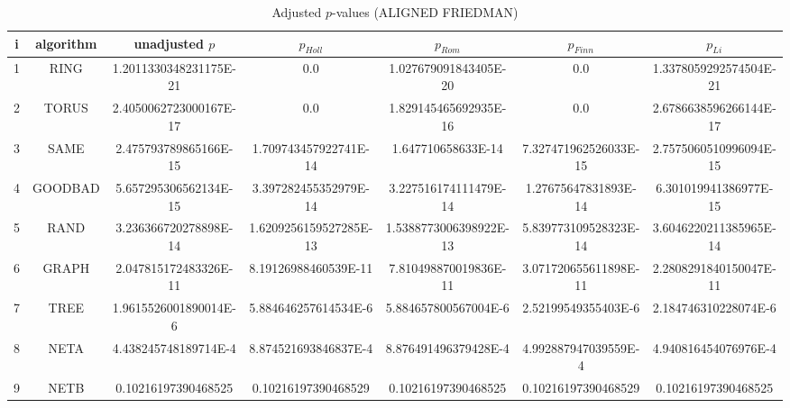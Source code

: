 \documentclass[a4paper,10pt]{article}
\begin{document}
\begin{landscape}
\begin{table}[!htp]
\centering\scriptsize
\caption{Adjusted $p$-values (ALIGNED FRIEDMAN)}
\begin{tabular}{ccccccc}
i&algorithm&unadjusted $p$&$p_{Holl}$&$p_{Rom}$&$p_{Finn}$&$p_{Li}$\\
\hline
1& RING&1.2011330348231175E-21&0.0&1.027679091843405E-20&0.0&1.3378059292574504E-21\\
2& TORUS&2.4050062723000167E-17&0.0&1.829145465692935E-16&0.0&2.6786638596266144E-17\\
3& SAME&2.475793789865166E-15&1.709743457922741E-14&1.647710658633E-14&7.327471962526033E-15&2.7575060510996094E-15\\
4& GOODBAD&5.657295306562134E-15&3.397282455352979E-14&3.227516174111479E-14&1.27675647831893E-14&6.301019941386977E-15\\
5& RAND&3.236366720278898E-14&1.6209256159527285E-13&1.5388773006398922E-13&5.839773109528323E-14&3.6046220211385965E-14\\
6& GRAPH&2.047815172483326E-11&8.19126988460539E-11&7.810498870019836E-11&3.071720655611898E-11&2.2808291840150047E-11\\
7& TREE&1.9615526001890014E-6&5.884646257614534E-6&5.884657800567004E-6&2.52199549355403E-6&2.184746310228074E-6\\
8& NETA&4.438245748189714E-4&8.874521693846837E-4&8.876491496379428E-4&4.992887947039559E-4&4.940816454076976E-4\\
9& NETB&0.10216197390468525&0.10216197390468529&0.10216197390468525&0.10216197390468529&0.10216197390468525\\
\hline
\end{tabular}
\end{table}


\newpage


\end{landscape}
\end{document}
